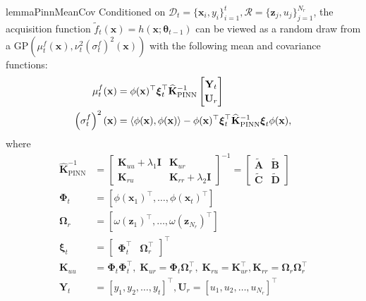 \begin{restatable}{lemma}{PinnMeanCov} 
\label{lemma:pinn-bo_PINN_mean_cov}
Conditioned on $\mathcal{D}_t = \{\mathbf{x}_i, y_i\}_{i=1}^t, \mathcal{R} = \{\mathbf{z}_j, u_j\}_{j=1}^{N_r}$, the acquisition function $\widetilde{f}_t(\mathbf{x}) = h(\mathbf{x}; \boldsymbol{\theta}_{t-1})$ can be viewed as a random draw from a $\mathrm{GP}\left(\mu_{t}^f (\mathbf{x}), \nu_t^2 \left(\sigma^f_t\right)^2(\mathbf{x})\right)$ with the following mean and covariance functions:
\begin{equation*}
\begin{split}
     \mu_{t}^f (\mathbf{x}) &= \phi(\mathbf{x})^\top \boldsymbol{\xi}_t^\top \mathbf{\widehat{K}}_\mathrm{PINN}^{-1} 
     \renewcommand\arraystretch{1.2}
     \begin{bmatrix}
         \mathbf{Y}_t \\
         \mathbf{U}_r
     \end{bmatrix} \\
    \left(\sigma^f_t\right)^2(\mathbf{x}) &=  \langle \phi(\mathbf{x}),  \phi(\mathbf{x}) \rangle - \phi(\mathbf{x})^\top \boldsymbol{\xi}_t^\top \mathbf{\widehat{K}}_\mathrm{PINN}^{-1} \boldsymbol{\xi}_t \phi(\mathbf{x}), \\
\end{split}
\end{equation*}
where 
\begin{equation*}
    \renewcommand\arraystretch{1.2}
    \begin{split}
\mathbf{\widehat{K}}_\mathrm{PINN}^{-1} &=  
    \begin{bmatrix}
    \mathbf{K}_{uu} + \lambda_1 \mathbf{I} & \mathbf{K}_{ur} \\
    \mathbf{K}_{ru} & \mathbf{K}_{rr} + \lambda_2 \mathbf{I}
    \end{bmatrix} ^{-1}  = \begin{bmatrix}
    \widetilde{\mathbf{A}} & \widetilde{\mathbf{B}} \\
    \widetilde{\mathbf{C}} & \widetilde{\mathbf{D}}
    \end{bmatrix}\\
    \boldsymbol{\Phi}_t & = [\phi(\mathbf{x}_1)^\top,\dots, \phi(\mathbf{x}_t)^\top ]  
\\
    \boldsymbol{\Omega}_r & = [\omega(\mathbf{z}_1)^\top, \dots, \omega(\mathbf{z}_{N_r})^\top ] \\ 
 \boldsymbol{\xi}_t &= \begin{bmatrix}
    \boldsymbol{\Phi}_t^\top & \boldsymbol{\Omega}_r^\top  
    \end{bmatrix}^\top 
\\
    \mathbf{K}_{uu} &= \boldsymbol{\Phi}_t \boldsymbol{\Phi}_t^\top, \;  \mathbf{K}_{ur} = \boldsymbol{\Phi}_t \boldsymbol{\Omega}_r^\top, \;
    \mathbf{K}_{ru} = \mathbf{K}_{ur}^\top, \mathbf{K}_{rr} = \boldsymbol{\Omega}_r \boldsymbol{\Omega}_r^\top 
\\
    \mathbf{Y}_t &= [y_1, y_2, \dots, y_t]^\top, 
    \mathbf{U}_r = [u_1, u_2, \dots, u_{N_r}]^\top \\
    \end{split}
\end{equation*}
\end{restatable}

